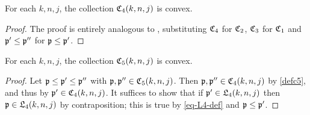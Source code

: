 \begin{lemma}[C4 convex]
    \label{C4-convex}
    \leanok
    For each $k,n,j$, the collection ${\mathfrak C}_4(k,n,j)$ is convex.
\end{lemma}

\begin{proof}
    \leanok
    The proof is entirely analogous to , substituting ${\mathfrak C}_4$ for ${\mathfrak C}_2$,
    ${\mathfrak C}_3$ for ${\mathfrak C}_1$ and ${\mathfrak p}'\le{\mathfrak p}''$ for ${\mathfrak p}\le{\mathfrak p}'$.
\end{proof}

\begin{lemma}[C5 convex]
    \label{C5-convex}
    \leanok
    For each $k,n,j$, the collection ${\mathfrak C}_5(k,n,j)$ is convex.
\end{lemma}

\begin{proof}
    \leanok
    Let ${\mathfrak p} \le {\mathfrak p}' \le{\mathfrak p}''$ with ${\mathfrak p}, {\mathfrak p}'' \in {\mathfrak C}_5(k,n,j)$.
    Then ${\mathfrak p}, {\mathfrak p}'' \in {\mathfrak C}_4(k,n,j)$ by \eqref{defc5}, and thus by  ${\mathfrak p}' \in {\mathfrak C}_4(k,n,j)$.
    It suffices to show that if ${\mathfrak p}' \in {\mathfrak L}_4(k,n,j)$ then ${\mathfrak p} \in {\mathfrak L}_4(k,n,j)$ by contraposition;
    this is true by \eqref{eq-L4-def} and ${\mathfrak p}\le{\mathfrak p}'$.
\end{proof}

